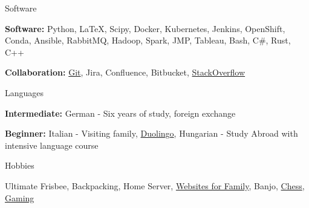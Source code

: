 

\begin{cventries}

  \cventry
    {Software} %
    {} %
    {} %
    {} %
    {
      \begin{cvitems} %
        \item {\textbf{Software:} Python, \LaTeX, Scipy, Docker, Kubernetes, Jenkins, OpenShift, Conda, Ansible, RabbitMQ, Hadoop, Spark, JMP, Tableau, Bash, C\#, Rust, C++}
        \item {\textbf{Collaboration:} \href{https://github.com/severalfew}{Git}, Jira, Confluence, Bitbucket, \href{https://stackoverflow.com/users/5037133/snygard}{StackOverflow}}
      \end{cvitems}
    }
  \cventry
    {Languages} %
    {} %
    {} %
    {} %
    {
      \begin{cvitems} %
        \item {\textbf{Intermediate:} German - Six years of study, foreign exchange}
        \item {\textbf{Beginner:} Italian - Visiting family, \href{https://www.duolingo.com/profile/grey_ranger}{Duolingo}, Hungarian - Study Abroad with intensive language course}
      \end{cvitems}
    }
  \cventry
    {Hobbies} %
    {} %
    {} %
    {} %
    {
      \begin{cvitems} %
        \item {Ultimate Frisbee, Backpacking, Home Server, \href{https://mallorynygard.com}{Websites for Family}, Banjo, \href{https://www.chess.com/member/grey_ranger}{Chess}, \href{https://steamcommunity.com/id/grey_ranger/}{Gaming}}
      \end{cvitems}
    }
\end{cventries}
